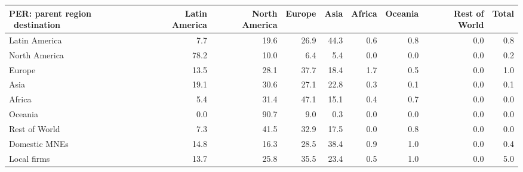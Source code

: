 \begin{tabular}{lrrrrrrrr}
\toprule
PER: parent region \ destination & Latin America & North America & Europe & Asia & Africa & Oceania & Rest of World & Total \\
\midrule
Latin America & 7.7 & 19.6 & 26.9 & 44.3 & 0.6 & 0.8 & 0.0 & 0.8 \\
North America & 78.2 & 10.0 & 6.4 & 5.4 & 0.0 & 0.0 & 0.0 & 0.2 \\
Europe & 13.5 & 28.1 & 37.7 & 18.4 & 1.7 & 0.5 & 0.0 & 1.0 \\
Asia & 19.1 & 30.6 & 27.1 & 22.8 & 0.3 & 0.1 & 0.0 & 0.1 \\
Africa & 5.4 & 31.4 & 47.1 & 15.1 & 0.4 & 0.7 & 0.0 & 0.0 \\
Oceania & 0.0 & 90.7 & 9.0 & 0.3 & 0.0 & 0.0 & 0.0 & 0.0 \\
Rest of World & 7.3 & 41.5 & 32.9 & 17.5 & 0.0 & 0.8 & 0.0 & 0.0 \\
Domestic MNEs & 14.8 & 16.3 & 28.5 & 38.4 & 0.9 & 1.0 & 0.0 & 0.4 \\
Local firms & 13.7 & 25.8 & 35.5 & 23.4 & 0.5 & 1.0 & 0.0 & 5.0 \\
\bottomrule
\end{tabular}
